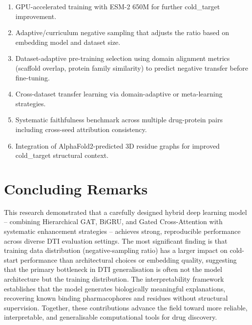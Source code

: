 \documentclass[12pt,a4paper,oneside]{report}
\begin{document}
\begin{enumerate}
  \item GPU-accelerated training with ESM-2 650M for further cold\_target improvement.
  \item Adaptive/curriculum negative sampling that adjusts the ratio based on embedding model and dataset size.
  \item Dataset-adaptive pre-training selection using domain alignment metrics (scaffold overlap, protein family similarity) to predict negative transfer before fine-tuning.
  \item Cross-dataset transfer learning via domain-adaptive or meta-learning strategies.
  \item Systematic faithfulness benchmark across multiple drug-protein pairs including cross-seed attribution consistency.
  \item Integration of AlphaFold2-predicted 3D residue graphs for improved cold\_target structural context.
\end{enumerate}

\section{Concluding Remarks}

This research demonstrated that a carefully designed hybrid deep learning model -- combining Hierarchical GAT, BiGRU, and Gated Cross-Attention with systematic enhancement strategies -- achieves strong, reproducible performance across diverse DTI evaluation settings. The most significant finding is that training data distribution (negative-sampling ratio) has a larger impact on cold-start performance than architectural choices or embedding quality, suggesting that the primary bottleneck in DTI generalisation is often not the model architecture but the training distribution. The interpretability framework establishes that the model generates biologically meaningful explanations, recovering known binding pharmacophores and residues without structural supervision. Together, these contributions advance the field toward more reliable, interpretable, and generalisable computational tools for drug discovery.
\end{document}
